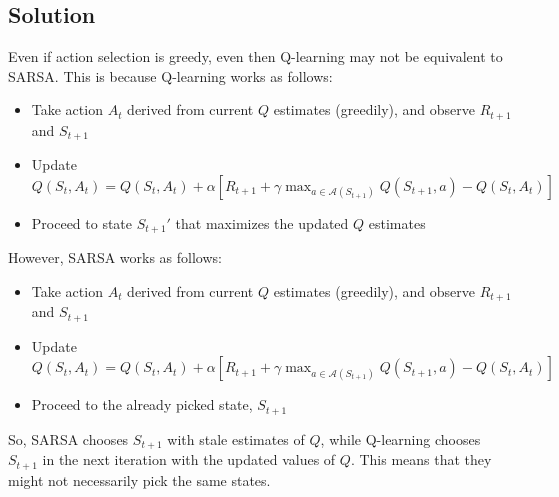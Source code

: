 \documentclass[11pt]{article}
\begin{document}
    \subsection*{Solution}
    Even if action selection is greedy, even then Q-learning may not be equivalent to SARSA. This is because
    Q-learning works as follows:
    \begin{itemize}
        \item Take action $A_{t}$ derived from current $Q$ estimates (greedily), and observe $R_{t+1}$ and $S_{t+1}$
        \item Update $Q(S_{t}, A_{t}) = Q(S_{t}, A_{t}) + \alpha \left[ R_{t+1} + \gamma \max_{a \in \mathcal{A}(S_{t+1})} Q(S_{t+1}, a) - Q(S_{t}, A_{t}) \right]$
        \item Proceed to state $S_{t+1}'$ that maximizes the updated $Q$ estimates
    \end{itemize}
    However, SARSA works as follows:
    \begin{itemize}
        \item Take action $A_{t}$ derived from current $Q$ estimates (greedily), and observe $R_{t+1}$ and $S_{t+1}$
        \item Update $Q(S_{t}, A_{t}) = Q(S_{t}, A_{t}) + \alpha \left[ R_{t+1} + \gamma \max_{a \in \mathcal{A}(S_{t+1})} Q(S_{t+1}, a) - Q(S_{t}, A_{t}) \right]$
        \item Proceed to the already picked state, $S_{t+1}$
    \end{itemize}
    So, SARSA chooses $S_{t+1}$ with stale estimates of $Q$, while Q-learning chooses $S_{t+1}$ in
    the next iteration with the updated values of $Q$. This means that they might not necessarily pick
    the same states.
\end{document}
